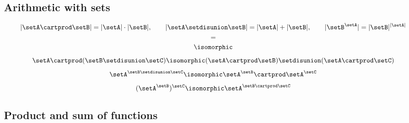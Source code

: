 \begin{forslides}
\subsection{Arithmetic with sets}

\begin{equation}\label{eq:slides_session2_163}
\vert \setA \cartprod \setB \vert = \vert \setA \vert \cdot \vert \setB \vert, \qquad \vert \setA \setdisunion \setB \vert = \vert \setA \vert + \vert \setB \vert, \qquad \vert \setB^{\setA} \vert = \vert \setB \vert^{\vert \setA \vert}
\end{equation}
\begin{equation}\label{eq:slides_session2_164}
=
\end{equation}
\begin{equation}\label{eq:slides_session2_165}
\isomorphic
\end{equation}
\begin{equation}\label{eq:slides_session2_166}
\setA \cartprod (\setB \setdisunion \setC)  \isomorphic (\setA \cartprod \setB) \setdisunion (\setA \cartprod \setC)
\end{equation}
\begin{equation}\label{eq:slides_session2_167}
\setA^{\setB \setdisunion \setC} \isomorphic \setA^\setB \cartprod \setA^\setC
\end{equation}
\begin{equation}\label{eq:slides_session2_168}
(\setA^\setB)^\setC  \isomorphic \setA^{\setB \cartprod \setC}
\end{equation}

\subsection{Product and sum of functions}


\end{forslides}
